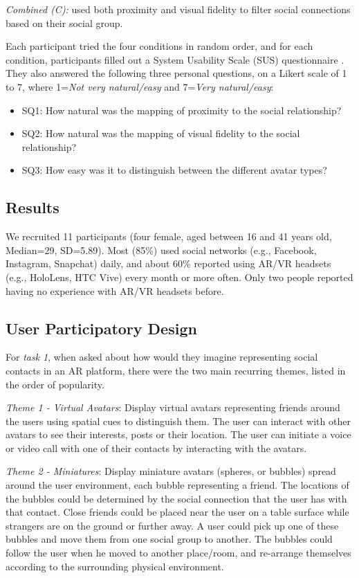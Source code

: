 \textit{Combined (C):} used both proximity and visual fidelity to filter social connections based on their social group.

Each participant tried the four conditions in random order, and for each condition, participants filled out a System Usability Scale (SUS) questionnaire \cite{brooke1996sus}. They also answered the following three personal questions, on a Likert scale of 1 to 7, where 1=\textit{Not very natural/easy} and 7=\textit{Very natural/easy}:

\begin{itemize}
    \item SQ1: How natural was the mapping of proximity to the social relationship?
    \item SQ2: How natural was the mapping of visual fidelity to the social relationship?
    \item SQ3: How easy was it to distinguish between the different avatar types?
\end{itemize}

\subsection{Results}

We recruited 11 participants (four female, aged between 16 and 41 years old, Median=29, SD=5.89). Most (85\%) used social networks (e.g., Facebook, Instagram, Snapchat) daily, and about 60\% reported using AR/VR headsets (e.g., HoloLens, HTC Vive) every month or more often. Only two people reported having no experience with AR/VR headsets before.

\subsection{User Participatory Design}

For \textit{task 1}, when asked about how would they imagine representing social contacts in an AR platform, there were the two main recurring themes, listed in the order of popularity.

\textit{Theme 1 - Virtual Avatars}: Display virtual avatars representing friends around the users using spatial cues to distinguish them. The user can interact with other avatars to see their interests, posts or their location. The user can initiate a voice or video call with one of their contacts by interacting with the avatars.

\textit{Theme 2 - Miniatures}: Display miniature avatars (spheres, or bubbles) spread around the user environment, each bubble representing a friend. The locations of the bubbles could be determined by the social connection that the user has with that contact. Close friends could be placed near the user on a table surface while strangers are on the ground or further away. A user could pick up one of these bubbles and move them from one social group to another. The bubbles could follow the user when he moved to another place/room, and re-arrange themselves according to the surrounding physical environment.

